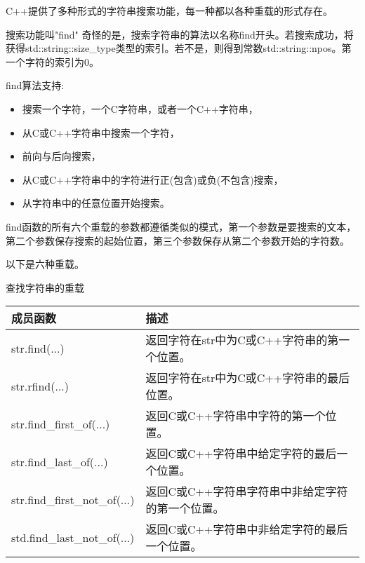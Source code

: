 
C++提供了多种形式的字符串搜索功能，每一种都以各种重载的形式存在。

\begin{myTip}{搜索功能叫"find"}
奇怪的是，搜索字符串的算法以名称find开头。若搜索成功，将获得std::string::size\_type类型的索引。若不是，则得到常数std::string::npos。第一个字符的索引为0。
\end{myTip}

find算法支持:

\begin{itemize}
\item 
搜索一个字符，一个C字符串，或者一个C++字符串，

\item 
从C或C++字符串中搜索一个字符，

\item 
前向与后向搜索，

\item 
从C或C++字符串中的字符进行正(包含)或负(不包含)搜索，

\item 
从字符串中的任意位置开始搜索。
\end{itemize}

find函数的所有六个重载的参数都遵循类似的模式，第一个参数是要搜索的文本，第二个参数保存搜索的起始位置，第三个参数保存从第二个参数开始的字符数。

以下是六种重载。

\begin{center}
查找字符串的重载
\end{center}

\begin{longtable}[c]{|l|l|}
\hline
\textbf{成员函数} & \textbf{描述}                                                      \\ \hline
\endfirsthead
%
\endhead
%
str.find(...)             & 返回字符在str中为C或C++字符串的第一个位置。      \\ \hline
str.rfind(...)            & 返回字符在str中为C或C++字符串的最后位置。       \\ \hline
str.find\_first\_of(...)  & 返回C或C++字符串中字符的第一个位置。 \\ \hline
str.find\_last\_of(...)   & 返回C或C++字符串中给定字符的最后一个位置。   \\ \hline
str.find\_first\_not\_of(...) & 返回C或C++字符串字符串中非给定字符的第一个位置。 \\ \hline
std.find\_last\_not\_of(...)  & 返回C或C++字符串中非给定字符的最后一个位置。  \\ \hline
\end{longtable}


